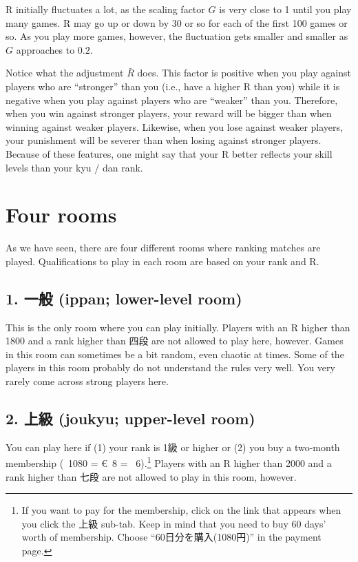 \bigskip
R initially fluctuates a lot, as the scaling factor $G$ is very close to 1 until you play many games. R may go up or down by 30 or so for each of the first 100 games or so. As you play more games, however, the fluctuation gets smaller and smaller as $G$ approaches to $0.2$.

\bigskip
Notice what the adjustment $\bar{R}$ does. This factor is positive when you play against players who are ``stronger'' than you (i.e., have a higher R than you) while it is negative when you play against players who are ``weaker'' than you. Therefore, when you win against stronger players, your reward will be bigger than when winning against weaker players. Likewise, when you lose against weaker players, your punishment will be severer than when losing against stronger players.
Because of these features, one might say that your R better reflects your skill levels than your {\jap kyu / dan} rank.

\section{Four rooms}
As we have seen, there are four different rooms where ranking matches are played. Qualifications to play in each room are based on your rank and R.

\subsection*{1. 一般 ({\jap ippan}; lower-level room)}
This is the only room where you can play initially. Players with an R higher than 1800 and a rank higher than 四段 are not allowed to play here, however. Games in this room can sometimes be a bit random, even chaotic at times. Some of the players in this room probably do not understand the rules very well. You very rarely come across strong players here.

\subsection*{2. 上級 ({\jap joukyu}; upper-level room)}
You can play here if (1) your rank is 1級 or higher or (2) you buy a two-month membership (\textyen~1080 = \euro~8 = \textsterling~6).\footnote{If you want to pay for the membership, click on the link that appears when you click the 上級 sub-tab. Keep in mind that you need to buy 60 days' worth of membership. Choose ``60日分を購入(1080円)'' in the payment page.} Players with an R higher than 2000 and a rank higher than 七段 are not allowed to play in this room, however.

